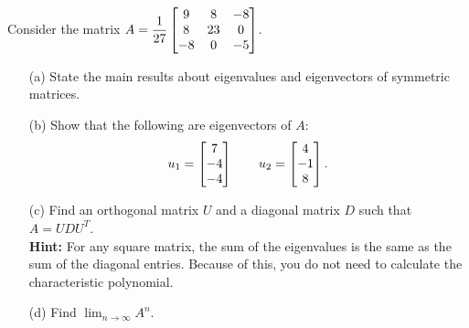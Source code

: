 \documentclass[a4paper]{article}
\begin{document}
\begin{problem}[2013-14]
 Consider the matrix
 $\displaystyle 
     A= \frac{1}{27}\left[\begin{matrix}
     9&8&-8\\
     8&23&0\\
     -8&0&-5
     \end{matrix}\right]
 $.
 \begin{itemize}
  \item[(a)] State the main results about eigenvalues and eigenvectors
   of symmetric matrices. 
  \item[(b)] Show that the following are eigenvectors of $A$: 
   \[ u_1 = \left[\begin{matrix} 7 \\ -4 \\ -4 \end{matrix}\right] 
      \qquad
      u_2 = \left[\begin{matrix} 4 \\ -1 \\ 8 \end{matrix}\right].
   \]
  \item[(c)] Find an orthogonal matrix $U$ and a diagonal matrix $D$
   such that $A=UDU^T$.  \\
   \textbf{Hint:} For any square matrix, the sum of the eigenvalues is 
   the same as the sum of the diagonal entries.  Because of this, you
   do not need to calculate the characteristic polynomial.
  \item[(d)] Find $\lim_{n\to \infty}A^n$. 
 \end{itemize}
\end{problem}
\end{document}
